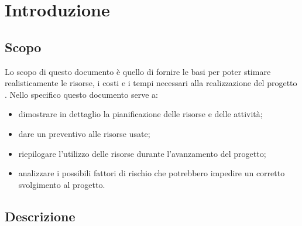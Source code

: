 \documentclass[12pt,a4paper]{article}
\begin{document}
\tableofcontents
\newpage

\listoftables
\listoffigures
\newpage

\section{Introduzione} 

\subsection{Scopo}
Lo scopo di questo documento è quello di fornire le basi per poter stimare realisticamente le risorse, i costi e i tempi necessari alla realizzazione del progetto \textit{\prjL{}}. Nello specifico questo documento serve a:
\begin{itemize}
	\item dimostrare in dettaglio la pianificazione delle risorse e delle attività;
	\item dare un preventivo alle risorse usate;
	\item riepilogare l'utilizzo delle risorse durante l'avanzamento del progetto;
	\item analizzare i possibili fattori di rischio che potrebbero impedire un corretto svolgimento al progetto.
\end{itemize}

\subsection{Descrizione}
\end{document}
